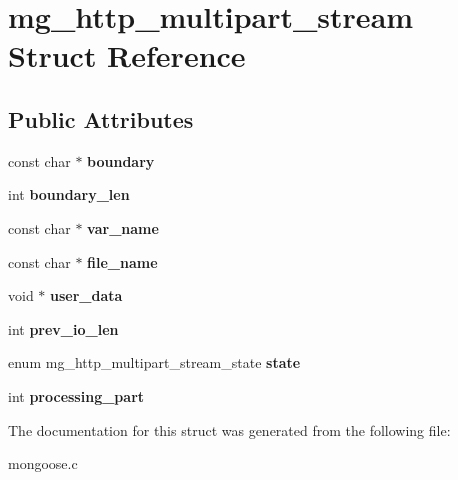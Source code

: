 \hypertarget{structmg__http__multipart__stream}{}\section{mg\+\_\+http\+\_\+multipart\+\_\+stream Struct Reference}
\label{structmg__http__multipart__stream}
\subsection*{Public Attributes}
\begin{DoxyCompactItemize}
\item 
\mbox{\label{structmg__http__multipart__stream_a3d11ab1b3c615d48ea25bb3bf8e9f177}} 
const char $\ast$ {\bfseries boundary}
\item 
\mbox{\label{structmg__http__multipart__stream_a80ee5d864783ca07c0a1f05fd4622a4d}} 
int {\bfseries boundary\+\_\+len}
\item 
\mbox{\label{structmg__http__multipart__stream_a4fd8fc13c41018970fc693e67c785581}} 
const char $\ast$ {\bfseries var\+\_\+name}
\item 
\mbox{\label{structmg__http__multipart__stream_a5738270f2832102f935276c85c86e427}} 
const char $\ast$ {\bfseries file\+\_\+name}
\item 
\mbox{\label{structmg__http__multipart__stream_afbd0589be4b387576e5780a31b74c3a7}} 
void $\ast$ {\bfseries user\+\_\+data}
\item 
\mbox{\label{structmg__http__multipart__stream_a283091a42c25b39fc89874e0180efa29}} 
int {\bfseries prev\+\_\+io\+\_\+len}
\item 
\mbox{\label{structmg__http__multipart__stream_a2f0a90e902fb206b20b207fc691e1748}} 
enum mg\+\_\+http\+\_\+multipart\+\_\+stream\+\_\+state {\bfseries state}
\item 
\mbox{\label{structmg__http__multipart__stream_ac0f7c41900e3cdfe92b21ef5608780dc}} 
int {\bfseries processing\+\_\+part}
\end{DoxyCompactItemize}


The documentation for this struct was generated from the following file\+:\begin{DoxyCompactItemize}
\item 
mongoose.\+c\end{DoxyCompactItemize}
